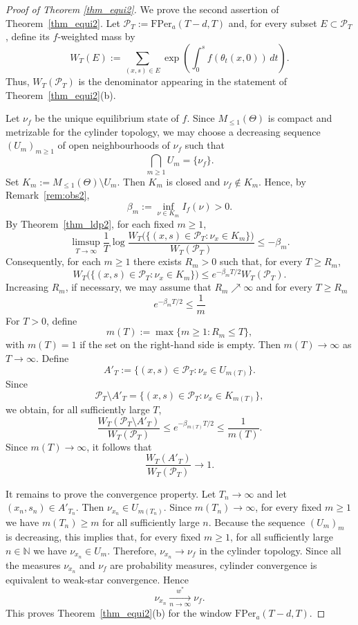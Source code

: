 \documentclass[letterpaper,11pt]{amsart}
\numberwithin{equation}{section}     %
\newcommand{\N}{\mathbb{N}}
\def\N{{\mathbb N}}
\def\le{\leqslant}
\def\ge{\geqslant}
\begin{document}
\begin{proof}[Proof of Theorem \ref{thm_equi2}]
We prove the second assertion of Theorem~\ref{thm_equi2}. Let $\mathcal P_T:=\text{FPer}_a(T-d,T)$
and, for every subset \(E\subset \mathcal P_T\), define its \(f\)-weighted mass by
\[
        W_T(E):=
        \sum_{(x,s)\in E}
        \exp\left(\int_0^s f(\theta_t(x,0))\,dt\right).
\]
Thus, \(W_T(\mathcal P_T)\) is the denominator appearing in the statement of
Theorem~\ref{thm_equi2}(b).

Let $\nu_f$ be the unique equilibrium state of $f$.  Since $M_{\le 1}(\Theta)$ is compact and metrizable for the cylinder topology, we may
choose a decreasing sequence 
$(U_m)_{m\ge1}$ of open neighbourhoods of $\nu_f$ such that
\[
        \bigcap_{m\ge1} U_m=\{\nu_f\}.
\]
Set $K_m:=M_{\le1}(\Theta)\setminus U_m$.
Then $K_m$ is closed and $\nu_f\notin K_m$.  Hence, by Remark~\ref{rem:obs2},
\[
        \beta_m:=\inf_{\nu\in K_m} I_f(\nu)>0 .
\]
By Theorem~\ref{thm_ldp2}, for each fixed $m\ge1$,
\[
 \limsup_{T\to\infty}
 \frac1T
 \log
 \frac{
 W_T\bigl(\{(x,s)\in\mathcal P_T:\nu_x\in K_m\}\bigr)
 }{
 W_T(\mathcal P_T)
 }
 \le -\beta_m .
\]
Consequently, for each $m\ge1$ there exists $R_m>0$ such that, for every
$T\ge R_m$,
\[
        W_T\bigl(\{(x,s)\in\mathcal P_T:\nu_x\in K_m\}\bigr)
        \le e^{-\beta_m T/2} W_T(\mathcal P_T).
\]
Increasing $R_m$, if necessary, we may assume that $R_m\nearrow\infty$ and for every $T\ge R_m$
\[
        e^{-\beta_m T/2}\le \frac1m
       \]
For $T>0$, define
\[
        m(T):=\max\{m\ge1:R_m\le T\},
\]
with $m(T)=1$ if the set on the right-hand side is empty.  Then
$m(T)\to\infty$ as $T\to\infty$.  Define
\[
        A'_T:=
        \{(x,s)\in \mathcal P_T:\nu_x\in U_{m(T)}\}.
\]
Since
\[
        \mathcal P_T\setminus A'_T
        =
        \{(x,s)\in\mathcal P_T:\nu_x\in K_{m(T)}\},
\]
we obtain, for all sufficiently large $T$,
\[
 \frac{W_T(\mathcal P_T\setminus A'_T)}{W_T(\mathcal P_T)}
 \le e^{-\beta_{m(T)}T/2}
 \le \frac1{m(T)}.
\]
Since $m(T)\to\infty$, it follows that
\[
        \frac{W_T(A'_T)}{W_T(\mathcal P_T)}\longrightarrow 1 .
\]

It remains to prove the convergence property.  Let $T_n\to\infty$ and let
$(x_n,s_n)\in A'_{T_n}$. Then
$\nu_{x_n}\in U_{m(T_n)}.$
Since $m(T_n)\to\infty$, for every fixed $m\ge1$ we have
$m(T_n)\ge m$ for all sufficiently large $n$.  Because the sequence
$(U_m)_m$ is decreasing, this implies that, for every fixed $m\ge1$, for all sufficiently large $n \in \N$ we have  $  \nu_{x_n}\in U_m$. 
Therefore, $\nu_{x_n}\to\nu_f$ in the cylinder topology. Since all the measures
$\nu_{x_n}$ and $\nu_f$ are probability measures, cylinder convergence is
equivalent to weak-star convergence. Hence
\[
        \nu_{x_n}\xrightarrow[n\to\infty]{w^*}\nu_f.
\]
This proves Theorem~\ref{thm_equi2}(b) for the window
\(\text{FPer}_a(T-d,T)\).


\end{proof}
\end{document}
